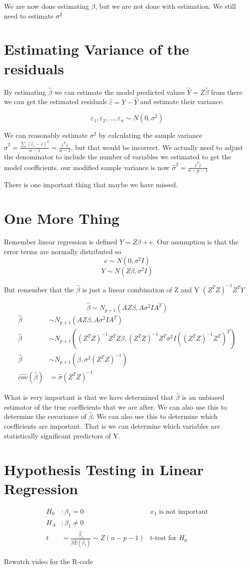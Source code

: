 We are now done estimating $\beta$, but we are not done with estimation. We still need to estimate $\sigma^2$

\section{Estimating Variance of the residuals}
By estimating $\hat{\beta}$ we can estimate the model predicted values $\hat{Y} = Z\hat{\beta}$ from there we can get the estimated residuals $\hat{\varepsilon} = Y-\hat{Y}$ and estimate their variance.

\[\varepsilon_1,\varepsilon_2,..., \varepsilon_n \sim N(0,\sigma^2)\]

We can reasonably estimate $\sigma^2$ by calculating the sample variance $\hat{\sigma}^2 = \frac{\sum (\hat{\varepsilon_i}-\overline{\varepsilon})^2}{n-1} = \frac{\hat{\varepsilon}^T\hat{\varepsilon}}{n-1}$, but that would be incorrect. We actually need to adjust the denominator to include the number of variables we estimated to get the model coefficients. our modified sample variance is now $\hat{\sigma}^2=\frac{\hat{\varepsilon}^T\hat{\varepsilon}}{n-p-1}$

There is one important thing that maybe we have missed.
\section{One More Thing}
Remember linear regression is defined $Y = Z\beta + e$. Our assumption is that the error terms are normally distributed so
\[e \sim N(0,\sigma^2 I)\]
\[Y \sim N(Z\beta,\sigma^2 I)\]

But remember that the $\hat{\beta}$ is just a linear combination of Z and Y $(Z^TZ)^{-1}Z^TY$

\[\hat{\beta} \sim N_{p+1} (AZ\beta,A\sigma^2IA^T)\]
\begin{align*}
    \hat{\beta} & \sim N_{p+1} (AZ\beta,A\sigma^2IA^T) \\
    \hat{\beta} & \sim N_{p+1} ((Z^TZ)^{-1}Z^TZ\beta,(Z^TZ)^{-1}Z^T\sigma^2I((Z^TZ)^{-1}Z^T)^T)\\
    \hat{\beta} & \sim N_{p+1}(\beta,\sigma^2(Z^TZ)^{-1})\\
    \hat{cov}(\hat{\beta}) &= \hat{\sigma}(Z^TZ)^{-1}
\end{align*}

What is very important is that we have determined that $\hat{\beta}$ is an unbiased estimator of the true coefficients that we are after. We can also use this to determine the covariance of $\hat{\beta}$. We can also use this to determine which coefficients are important. That is we can determine which variables are statistically significant predictors of Y.

\section{Hypothesis Testing in Linear Regression}
\begin{align*}
    H_0 &: \beta_1 = 0 &\text{$x_1$ is not important}\\
    H_A&: \beta_1 \neq 0 \\
    t &= \frac{\hat{\beta_1}}{\hat{SE}(\hat{\beta}_1)}\sim Z(n-p-1) &\text{t-test for $H_0$}
\end{align*}

Rewatch video for the R-code

